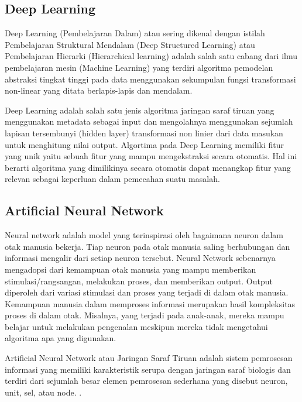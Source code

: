 \subsection{Deep Learning}
Deep Learning (Pembelajaran Dalam) atau sering dikenal dengan istilah Pembelajaran Struktural Mendalam (Deep Structured Learning) atau Pembelajaran Hierarki (Hierarchical learning) adalah salah satu cabang dari ilmu pembelajaran mesin (Machine Learning) yang terdiri algoritma pemodelan abstraksi tingkat tinggi pada data menggunakan sekumpulan fungsi transformasi non-linear yang ditata berlapis-lapis dan mendalam.

Deep Learning adalah salah satu jenis algoritma jaringan saraf tiruan yang menggunakan metadata sebagai input dan mengolahnya menggunakan sejumlah lapisan tersembunyi (hidden layer) transformasi non linier dari data masukan untuk menghitung nilai output. Algortima pada Deep Learning memiliki fitur yang unik yaitu sebuah fitur yang mampu mengekstraksi secara otomatis. Hal ini berarti algoritma yang dimilikinya secara otomatis dapat menangkap fitur yang relevan sebagai keperluan dalam pemecahan suatu masalah. \cite{brownlee2014machine}

\subsection{Artificial Neural Network}
Neural network adalah model yang terinspirasi oleh bagaimana neuron dalam otak manusia bekerja. Tiap neuron pada otak manusia saling berhubungan dan informasi mengalir dari setiap neuron tersebut. Neural Network sebenarnya mengadopsi dari kemampuan otak manusia yang mampu memberikan stimulasi/rangsangan, melakukan proses, dan memberikan output. Output diperoleh dari variasi stimulasi dan proses yang terjadi di dalam otak manusia. Kemampuan manusia dalam memproses informasi merupakan hasil kompleksitas proses di dalam otak. Misalnya, yang terjadi pada anak-anak, mereka mampu belajar untuk melakukan pengenalan meskipun mereka tidak mengetahui algoritma apa yang digunakan.

Artificial Neural Network atau Jaringan Saraf Tiruan adalah sistem pemrosesan informasi yang memiliki karakteristik serupa dengan jaringan saraf biologis dan terdiri dari sejumlah besar elemen pemrosesan sederhana yang disebut neuron, unit, sel, atau node. \cite{irwansyah2015advanced}.

